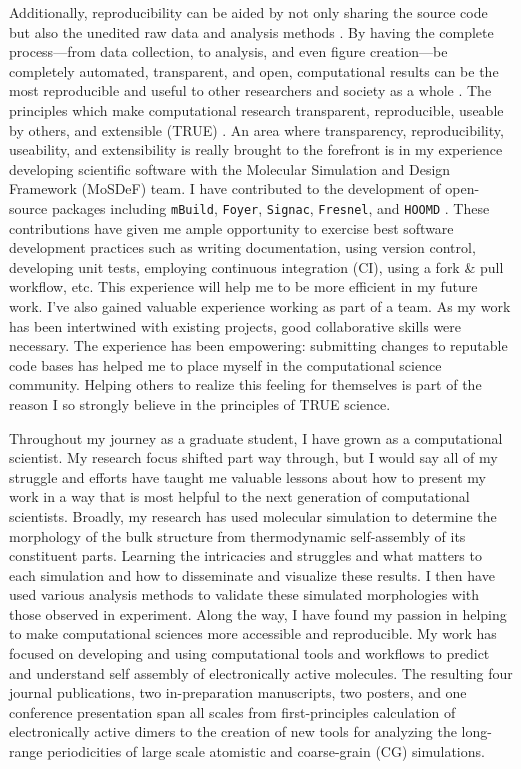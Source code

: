 Additionally, reproducibility can be aided by not only sharing the source code but also the unedited raw data and analysis methods \cite{Miyakawa2020}. 
By having the complete process---from data collection, to analysis, and even figure creation---be completely automated, transparent, and open, computational results can be the most reproducible and useful to other researchers and society as a whole \cite{Taylor2019, Donoho2009}.
The principles which make computational research transparent, reproducible, useable by others, and extensible (TRUE) \cite{Thompson2020}.
An area where transparency, reproducibility, useability, and extensibility is really brought to the forefront is in my experience developing scientific software with the Molecular Simulation and Design Framework (MoSDeF) team.
I have contributed to the development of open-source packages including \texttt{mBuild}, \texttt{Foyer}, \texttt{Signac}, \texttt{Fresnel}, and \texttt{HOOMD} \cite{mbuild, foyer, signac, fresnel, hoomd}.
These contributions have given me ample opportunity to exercise best software development practices such as writing documentation, using version control, developing unit tests, employing continuous integration (CI), using a fork \& pull workflow, etc.
This experience will help me to be more efficient in my future work.
I've also gained valuable experience working as part of a team.
As my work has been intertwined with existing projects, good collaborative skills were necessary.
The experience has been empowering: submitting changes to reputable code bases has helped me to place myself in the computational science community.
Helping others to realize this feeling for themselves is part of the reason I so strongly believe in the principles of TRUE science.

Throughout my journey as a graduate student, I have grown as a computational scientist.
My research focus shifted part way through, but I would say all of my struggle and efforts have taught me valuable lessons about how to present my work in a way that is most helpful to the next generation of computational scientists.
Broadly, my research has used molecular simulation to determine the morphology of the bulk structure from thermodynamic self-assembly of its constituent parts. 
Learning the intricacies and struggles and what matters to each simulation and how to disseminate and visualize these results.
I then have used various analysis methods to validate these simulated morphologies with those observed in experiment. 
Along the way, I have found my passion in helping to make computational sciences more accessible and reproducible.
My work has focused on developing and using computational tools and workflows to predict and understand self assembly of electronically active molecules.
The resulting four journal publications, two in-preparation manuscripts, two posters, and one conference presentation span all scales from first-principles calculation of electronically active dimers to the creation of new tools for analyzing the long-range periodicities of large scale atomistic and coarse-grain (CG) simulations.


